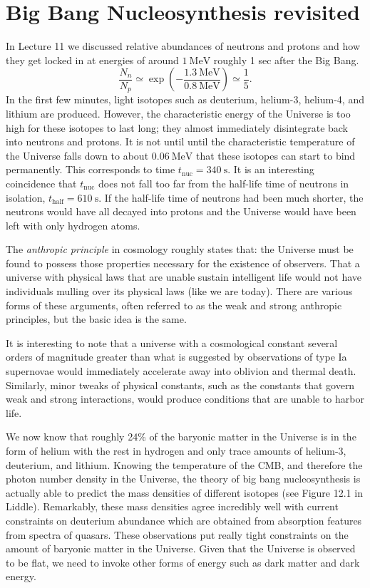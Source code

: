 \documentclass[a4paper,12pt]{article}
\theoremstyle{remark}
\newcommand{\mrm}[1]{\mathrm{#1}}
\renewcommand{\=}[1]{\stackrel{#1}{=}} %
\theoremstyle{plain}
\theoremstyle{definition}
\begin{document}
\section{Big Bang Nucleosynthesis revisited}

In Lecture 11 we discussed relative abundances of neutrons and protons and how they get locked in at energies of around $1 \:\mrm{MeV}$ roughly 1 sec after the Big Bang. 
\begin{equation}
\frac{N_n}{N_p} \simeq \exp \left( - \frac{1.3 \:\mrm{MeV}}{0.8 \:\mrm{MeV}} \right) \simeq \frac{1}{5}. 
\end{equation}
In the first few minutes, light isotopes such as deuterium, helium-3, helium-4, and lithium are produced. However, the characteristic energy of the Universe is too high for these isotopes to last long; they almost immediately disintegrate back into neutrons and protons. It is not until until the characteristic temperature of the Universe falls down to about $0.06 \:\mrm{MeV}$ that these isotopes can start to bind permanently. This corresponds to time $t_\mrm{nuc} = 340 \:\mrm{s}$. It is an interesting coincidence that $t_\mrm{nuc}$ does not fall too far from the half-life time of neutrons in isolation, $t_\mrm{half} = 610 \:\mrm{s}$. If the half-life time of neutrons had been much shorter, the neutrons would have all decayed into protons and the Universe would have been left with only hydrogen atoms.

The \textit{anthropic principle} in cosmology roughly states that: the Universe must be found to possess those properties necessary for the existence of observers. That a universe with physical laws that are unable sustain intelligent life would not have individuals mulling over its physical laws (like we are today). There are various forms of these arguments, often referred to as the weak and strong anthropic principles, but the basic idea is the same. 

It is interesting to note that a universe with a cosmological constant several orders of magnitude greater than what is suggested by observations of type Ia supernovae would immediately accelerate away into oblivion and thermal death. Similarly, minor tweaks of physical constants, such as the constants that govern weak and strong interactions, would produce conditions that are unable to harbor life.

We now know that roughly 24\% of the baryonic matter in the Universe is in the form of helium with the rest in hydrogen and only trace amounts of helium-3, deuterium, and lithium. Knowing the temperature of the CMB, and therefore the photon number density in the Universe, the theory of big bang nucleosynthesis is actually able to predict the mass densities of different isotopes (see Figure 12.1 in Liddle). Remarkably, these mass densities agree incredibly well with current constraints on deuterium abundance which are obtained from absorption features from spectra of quasars. These observations put really tight constraints on the amount of baryonic matter in the Universe. Given that the Universe is observed to be flat, we need to invoke other forms of energy such as dark matter and dark energy.
\end{document}
